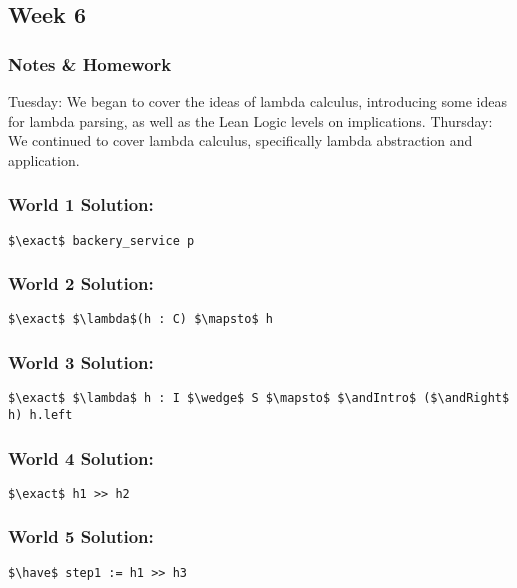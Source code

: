 \documentclass{article}
\DeclareMathOperator{\have}{have}
\DeclareMathOperator{\exact}{exact}
\DeclareMathOperator{\andIntro}{and\_intro}
\DeclareMathOperator{\andRight}{and\_right}
\theoremstyle{theorem}
\theoremstyle{definition}
\theoremstyle{remark}
\begin{document}
  \subsection{Week 6} 

  \subsubsection{Notes \& Homework}
  Tuesday: We began to cover the ideas of lambda calculus, introducing some ideas for lambda parsing, as well as the Lean Logic levels on implications. 
  \newline Thursday: We continued to cover lambda calculus, specifically lambda abstraction and application. 


    
    \subsubsection*{World 1 Solution:}
    \begin{lstlisting}[mathescape=true]
      $\exact$ backery_service p
    \end{lstlisting}

    \subsubsection*{World 2 Solution:}
    \begin{lstlisting}[mathescape=true]
      $\exact$ $\lambda$(h : C) $\mapsto$ h
    \end{lstlisting}
    
    \subsubsection*{World 3 Solution:}
    \begin{lstlisting}[mathescape=true]
      $\exact$ $\lambda$ h : I $\wedge$ S $\mapsto$ $\andIntro$ ($\andRight$ h) h.left
    \end{lstlisting}
  
    \subsubsection*{World 4 Solution:}
    \begin{lstlisting}[mathescape=true]
      $\exact$ h1 >> h2
    \end{lstlisting}

    \subsubsection*{World 5 Solution:}
    \begin{lstlisting}[mathescape=true]
      $\have$ step1 := h1 >> h3
    \end{lstlisting}
    
\end{document}
